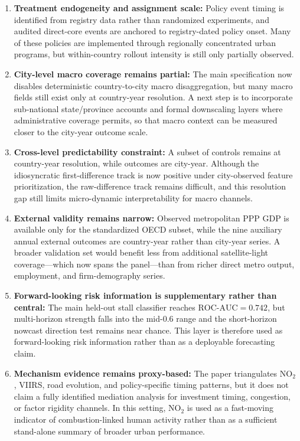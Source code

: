 \documentclass[11pt,a4paper]{article}
\begin{document}
\begin{enumerate}
  \item \textbf{Treatment endogeneity and assignment scale:} Policy event timing is identified from registry data rather than randomized experiments, and audited direct-core events are anchored to registry-dated policy onset. Many of these policies are implemented through regionally concentrated urban programs, but within-country rollout intensity is still only partially observed.
  \item \textbf{City-level macro coverage remains partial:} The main specification now disables deterministic country-to-city macro disaggregation, but many macro fields still exist only at country-year resolution. A next step is to incorporate sub-national state/province accounts and formal downscaling layers where administrative coverage permits, so that macro context can be measured closer to the city-year outcome scale.
  \item \textbf{Cross-level predictability constraint:} A subset of controls remains at country-year resolution, while outcomes are city-year. Although the idiosyncratic first-difference track is now positive under city-observed feature prioritization, the raw-difference track remains difficult, and this resolution gap still limits micro-dynamic interpretability for macro channels.
  \item \textbf{External validity remains narrow:} Observed metropolitan PPP GDP is available only for the standardized OECD subset, while the nine auxiliary annual external outcomes are country-year rather than city-year series. A broader validation set would benefit less from additional satellite-light coverage---which now spans the panel---than from richer direct metro output, employment, and firm-demography series.
  \item \textbf{Forward-looking risk information is supplementary rather than central:} The main held-out stall classifier reaches $\mathrm{ROC}$-$\mathrm{AUC}=0.742$, but multi-horizon strength falls into the mid-0.6 range and the short-horizon nowcast direction test remains near chance. This layer is therefore used as forward-looking risk information rather than as a deployable forecasting claim.
  \item \textbf{Mechanism evidence remains proxy-based:} The paper triangulates NO$_2$, VIIRS, road evolution, and policy-specific timing patterns, but it does not claim a fully identified mediation analysis for investment timing, congestion, or factor rigidity channels. In this setting, NO$_2$ is used as a fast-moving indicator of combustion-linked human activity rather than as a sufficient stand-alone summary of broader urban performance.

\end{enumerate}
\end{document}
